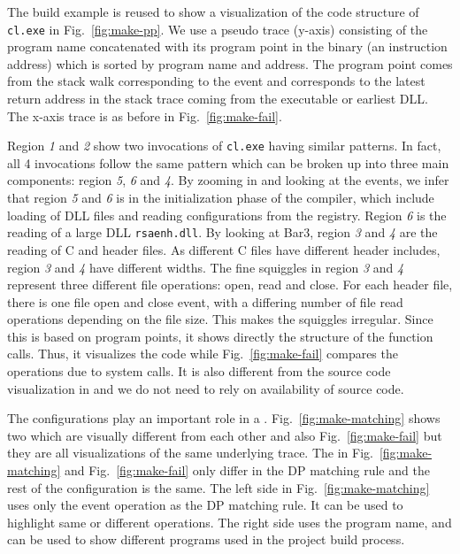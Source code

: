 The build example is reused to show a visualization of the code structure
of {\tt cl.exe} in Fig.~\ref{fig:make-pp}.
We use a pseudo trace (y-axis) consisting of the program name
concatenated with its program point in the binary (an instruction address)
which is sorted by program name and address.
The program point comes from the stack walk corresponding to the event
and corresponds to the latest return address in the stack trace
coming from the executable or earliest DLL.
The x-axis trace is as before in Fig.~\ref{fig:make-fail}.

Region {\em 1} and {\em 2} show two invocations of {\tt cl.exe}
having similar patterns.
In fact, all 4 invocations follow the same pattern which can be broken
up into three main components:
region {\em 5}, {\em 6} and {\em 4}.
By zooming in and looking at the events, we infer that
region {\em 5} and {\em 6} is in the initialization phase of the compiler, which include
loading of DLL files and reading configurations from the registry.
Region {\em 6} is the reading of a large DLL {\tt rsaenh.dll}.
By looking at Bar3,
region {\em 3} and {\em 4} are the reading of C and header files.
As different C files have different header includes,
region {\em 3} and {\em 4} have different widths.
The fine squiggles in region {\em 3} and {\em 4} represent
three different file operations: open, read and close.
For each header file, there is one file open and close event,
with a differing number of file read operations depending
on the file size.
This makes the squiggles irregular.
Since this \VDP{} is based on program points, it shows directly the 
structure of the function calls. Thus, it visualizes
the code while Fig.~\ref{fig:make-fail} compares the operations
due to system calls.
It is also different from the source code visualization in \cite{tralfamadore}
and we do not need to rely on availability of source code.

The configurations play an important role in a \VDP{}.
Fig.~\ref{fig:make-matching} shows two \VDPs{} 
which are visually different from each other and also Fig.~\ref{fig:make-fail}
but they are all visualizations of the same underlying trace.
The \VDPs{} in Fig.~\ref{fig:make-matching} and 
Fig.~\ref{fig:make-fail} only differ in the DP matching rule and
the rest of the configuration is the same.
The left side \VDP{} in Fig.~\ref{fig:make-matching} uses only the event 
operation as the DP matching rule.
It can be used to highlight same or different operations.
The right side \VDP{} uses the program name, and can be used to
show different programs used in the project build process.

